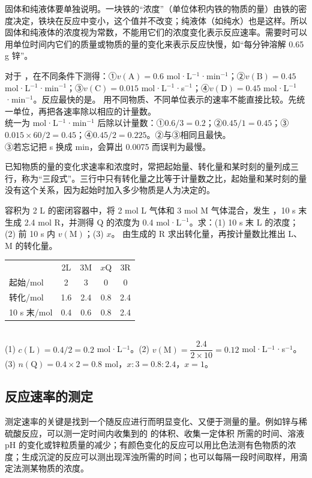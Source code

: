 固体和纯液体要单独说明。一块铁的“浓度”（单位体积内铁的物质的量）由铁的密度决定，铁块在反应中变小，这个值并不改变；纯液体（如纯水）也是这样。所以固体和纯液体的浓度视为常数，不能用它们的浓度变化表示反应速率。需要时可以用单位时间内它们的质量或物质的量的变化来表示反应快慢，如“每分钟溶解 0.65 g 锌”。

\begin{liti}[基础]
对于 ，在不同条件下测得：①$v(\mathrm{A})=0.6$ mol·L$^{-1}$·min$^{-1}$；②$v(\mathrm{B})=0.45$ mol·L$^{-1}$·min$^{-1}$；③$v(\mathrm{C})=0.015$ mol·L$^{-1}$·s$^{-1}$；④$v(\mathrm{D})=0.45$ mol·L$^{-1}$·min$^{-1}$。反应最快的是\tk。
\tcblower
\silu 用不同物质、不同单位表示的速率不能直接比较。先统一单位，再把各速率除以相应的计量数。\\
\jie 统一为 mol·L$^{-1}$·min$^{-1}$ 后除以计量数：①$0.6/3=0.2$；②$0.45/1=0.45$；③$0.015\times60/2=0.45$；④$0.45/2=0.225$。②与③相同且最快。\\
\xianjing ③若忘记把 s 换成 min，会算出 0.0075 而误判为最慢。
\end{liti}

已知物质的量的变化求速率和浓度时，常把起始量、转化量和某时刻的量列成三行，称为“三段式”。三行中只有转化量之比等于计量数之比，起始量和某时刻的量没有这个关系，因为起始时加入多少物质是人为决定的。

\begin{liti}[典型]
容积为 2 L 的密闭容器中，将 2 mol L 气体和 3 mol M 气体混合，发生 ，10 s 末生成 2.4 mol R，并测得 Q 的浓度为 0.4 mol·L$^{-1}$。求：(1) 10 s 末 L 的浓度；(2) 前 10 s 内 $v(\mathrm{M})$；(3) $x$。
\tcblower
\silu 由生成的 R 求出转化量，再按计量数比推出 L、M 的转化量。\\
\jie \begin{tabular}[t]{lcccc}
 & 2L & 3M & $x$Q & 3R \\
起始/mol & 2 & 3 & 0 & 0 \\
转化/mol & 1.6 & 2.4 & 0.8 & 2.4 \\
10 s 末/mol & 0.4 & 0.6 & 0.8 & 2.4
\end{tabular}\\
(1) $c(\mathrm{L})=0.4/2=0.2$ mol·L$^{-1}$。(2) $v(\mathrm{M})=\dfrac{2.4}{2\times10}=0.12$ mol·L$^{-1}$·s$^{-1}$。(3) $n(\mathrm{Q})=0.4\times2=0.8$ mol，$x:3=0.8:2.4$，$x=1$。
\end{liti}

\subsection{反应速率的测定}
测定速率的关键是找到一个随反应进行而明显变化、又便于测量的量。例如锌与稀硫酸反应，可以测一定时间内收集到的  的体积、收集一定体积  所需的时间、溶液 pH 的变化或锌粒质量的减少；有颜色变化的反应可以用比色法测有色物质的浓度；生成沉淀的反应可以测出现浑浊所需的时间；也可以每隔一段时间取样，用滴定法测某物质的浓度。

